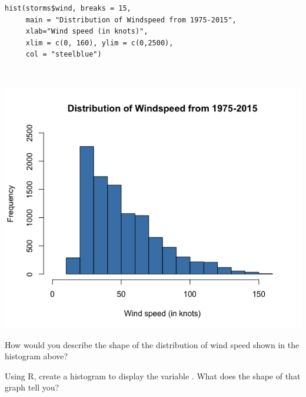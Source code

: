 \begin{multicols}{2}

\begin{lstlisting}
hist(storms$wind, breaks = 15,
     main = "Distribution of Windspeed from 1975-2015",
     xlab="Wind speed (in knots)",
     xlim = c(0, 160), ylim = c(0,2500), 
     col = "steelblue")
\end{lstlisting}

\columnbreak

\ \vspace{0.35in}

\includegraphics[width=0.4\tw]{02/fig-wind-hist.png}

\end{multicols}

\bb[resume]
\ii How would you describe the shape of the distribution of wind speed shown in the histogram above?


\bigskip

\ii Using R, create a histogram to display the variable \textbf{}. What does the shape of that graph tell you?  

